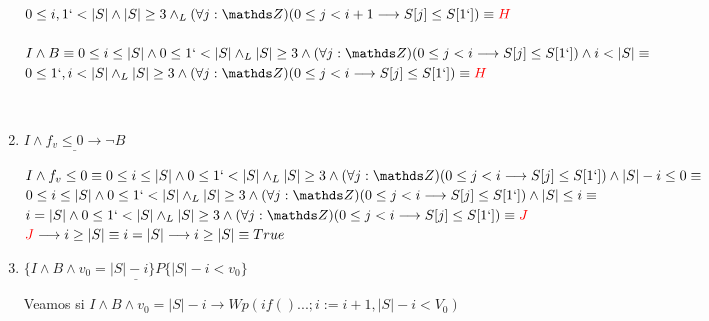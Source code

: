 \documentclass[10pt,a4paper]{article}
\begin{document}
\begin{enumerate}
         $0 \leq i,1`<|S| \land |S| \geq 3 \land_L (\forall j: \ent)(0\leq j < i+1 \longrightarrow S[j]\leq S[1`]) \equiv \textcolor{red}{H}$\\

         \\

         $I \land B \equiv 0\leq i\leq|S| \land 0 \leq 1`<|S|  \land_L |S| \geq 3 \land (\forall j: \ent)(0\leq j < i \longrightarrow S[j]\leq S[1`]) \land  i<|S| \equiv$ \\

         $ 0 \leq 1`,i<|S|  \land_L |S| \geq 3 \land (\forall j: \ent)(0\leq j < i \longrightarrow S[j]\leq S[1`])\equiv \textcolor{red}{H}$

         \\



    \item $\underline{I \land  f_v \leq 0 \longrightarrow \neg B}$

        $ I \land f_v \leq 0 \equiv 0\leq i\leq|S| \land 0 \leq 1`<|S|  \land_L |S| \geq 3 \land (\forall j: \ent)(0\leq j < i \longrightarrow S[j]\leq S[1`]) \land |S|-i\leq 0\equiv$\\

        $ 0\leq i\leq|S| \land 0 \leq 1`<|S|  \land_L |S| \geq 3 \land (\forall j: \ent)(0\leq j < i \longrightarrow S[j]\leq S[1`]) \land |S|\leq i \equiv$ \\

        $ i=|S| \land 0 \leq 1`<|S|  \land_L |S| \geq 3 \land (\forall j: \ent)(0\leq j < i \longrightarrow S[j]\leq S[1`])\equiv \textcolor{red}{J}$\\

        $\textcolor{red}{J} \longrightarrow i\geq |S| \equiv i=|S| \longrightarrow i\geq |S| \equiv True $\\

    \item $\underline{ \{ I \land B \land v_0=|S|-i \}P\{ |S|-i<v_0\} }$

    \text Veamos si $I\land B \land v_0 = |S| - i \longrightarrow Wp(if() ... ; i:= i + 1, |S| - i < V_0) $\\

    \\


\end{enumerate}
\end{document}
